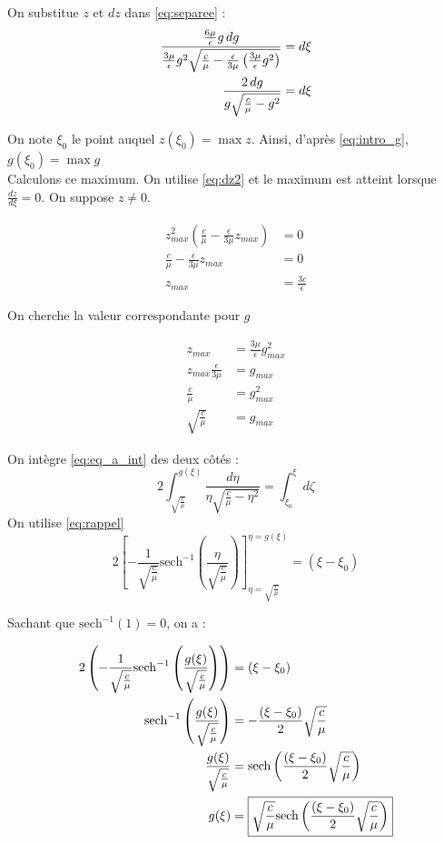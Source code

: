 \documentclass[11pt,a4paper]{article}
\begin{document}
On substitue $z$ et $dz$ dans \eqref{eq:separee} :
\begin{align}
\frac{\frac{6\mu}{\epsilon}g \, dg}{\frac{3\mu}{\epsilon}g^2 \sqrt{\frac{c}{\mu}
-\frac{\epsilon}{3\mu}\left(\frac{3\mu}{\epsilon}g^2\right)}} &= d\xi \notag\\
\frac{2 \, dg}{g \sqrt{\frac{c}{\mu}-g^2}} &= d\xi \label{eq:eq_a_int}
\end{align}

On note $\xi_{0}$ le point auquel $z(\xi_{0})=\max{z}$. Ainsi,
d'après \eqref{eq:intro_g}, $g(\xi_{0})=\max{g}$\\

Calculons ce maximum. On utilise \eqref{eq:dz2} et le maximum est atteint 
lorsque $\frac{dz}{d\xi}=0$. On suppose $z\ne 0$.

\begin{align*}
  z_{max}^{2}(\frac{c}{\mu}-\frac{\epsilon}{3\mu}z_{max}) &=0 \\
  \frac{c}{\mu}-\frac{\epsilon}{3\mu}z_{max} &=0 \\
  z_{max} &= \frac{3c}{\epsilon}
\end{align*}

\newpage{}

On cherche la valeur correspondante pour $g$

\begin{align*}
  z_{max} &=\frac{3\mu}{\epsilon}g_{max}^{2} \\
  z_{max} \frac{\epsilon}{3\mu} &= g_{max} \\
  \frac{c}{\mu} &= g_{max}^{2} \\
  \sqrt{\frac{c}{\mu}} &= g_{max}
\end{align*}

On intègre \eqref{eq:eq_a_int} des deux côtés :
$$
2 \int_{\sqrt{\frac{c}{\mu}}}^{g(\xi)} 
\frac{d\eta}{\eta \sqrt{\frac{c}{\mu}-\eta^2}} = \int_{\xi_{0}}^{\xi} d\zeta
$$
On utilise \eqref{eq:rappel}
$$
2 \left[ - \frac{1}{\sqrt{\frac{c}{\mu}}} 
\text{sech}^{-1}\left(\frac{\eta}{\sqrt{\frac{c}{\mu}}}\right) \right]^{\eta=g(\xi)}_{\eta=\sqrt{\frac{c}{\mu}}} = (\xi - \xi_0)
$$

Sachant que $\text{sech}^{-1}(1)=0$, on a :

\begin{align}
  2 \left( - \frac{1}{\sqrt{\frac{c}{\mu}}}
  \text{sech}^{-1}\left(\frac{g(\xi)}{\sqrt{\frac{c}{\mu}}}\right) \right) &= (\xi - \xi_0) \notag\\ 
  \text{sech}^{-1}\left(\frac{g(\xi)}{\sqrt{\frac{c}{\mu}}}\right) &= -\frac{(\xi - \xi_0)}{2} \sqrt{\frac{c}{\mu}} \notag\\
  \frac{g(\xi)}{\sqrt{\frac{c}{\mu}}} &= \text{sech}\left( \frac{(\xi - \xi_0)}{2} \sqrt{\frac{c}{\mu}} \right) \notag\\
g(\xi) &=\boxed{\sqrt{\frac{c}{\mu}} \text{sech}\left( \frac{(\xi - \xi_0)}{2} \sqrt{\frac{c}{\mu}} \right)} \label{eq:g_final}
\end{align}
\end{document}
